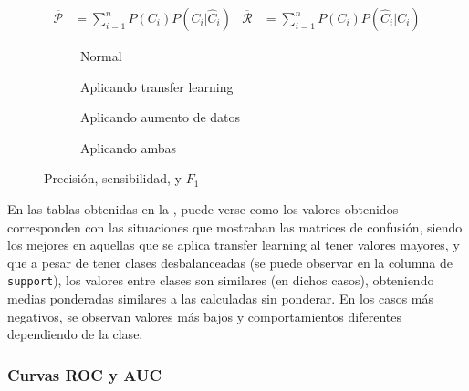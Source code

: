 				\begin{align*}
					\overline{\mathcal{P}} &= \sum_{i=1}^n P(C_i)P(C_i | \hat{C}_i) &
					\overline{\mathcal{R}} &= \sum_{i=1}^n P(C_i)P(\hat{C}_i | C_i)
				\end{align*}
				
				\begin{figure}[!h]
					\centering
					\scriptsize
					\begin{subfigure}{.5\textwidth}
						\centering
						
						\caption{Normal}
						\label{fig:m_conv}
					\end{subfigure}\hfill
					\begin{subfigure}{.5\textwidth}
						\centering
						
						\caption{Aplicando transfer learning}
						\label{fig:m_mb}
					\end{subfigure}
					\begin{subfigure}{.5\textwidth}
						\centering
						
						\caption{Aplicando aumento de datos}
						\label{fig:m_convau}
					\end{subfigure}\hfill
					\begin{subfigure}{.5\textwidth}
						\centering
						
						\caption{Aplicando ambas}
						\label{fig:m_mbau}
					\end{subfigure}
					\caption{Precisión, sensibilidad, y $F_1$}
					\label{fig:m}
				\end{figure}
				
				En las tablas obtenidas en la , puede verse como los valores obtenidos corresponden con las situaciones que mostraban las matrices de confusión, siendo los mejores en aquellas que se aplica transfer learning al tener valores mayores, y que a pesar de tener clases desbalanceadas (se puede observar en la columna de \texttt{support}), los valores entre clases son similares (en dichos casos), obteniendo medias ponderadas similares a las calculadas sin ponderar. En los casos más negativos, se observan valores más bajos y comportamientos diferentes dependiendo de la clase. 
			
			\subsubsection{Curvas ROC y AUC}
			
